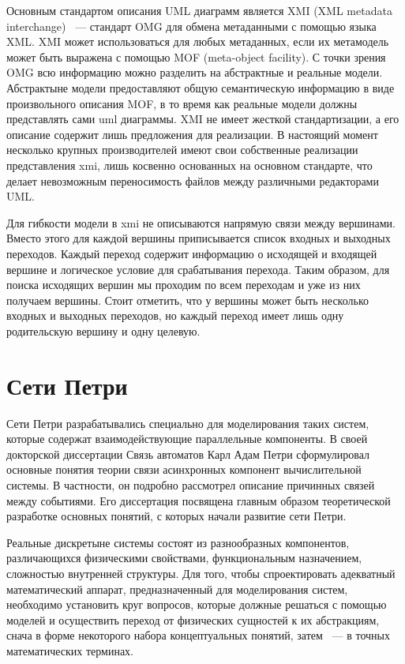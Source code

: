 Основным стандартом описания UML диаграмм является XMI (XML metadata interchange) ~--- стандарт OMG для обмена метаданными с помощью языка XML. XMI может использоваться для любых метаданных, если их метамодель может быть выражена с помощью MOF (meta-object facility). С точки зрения OMG всю информацию можно разделить на абстрактные и реальные модели. Абстрактыне модели предоставляют общую семантическую информацию в виде произвольного описания MOF, в то время как реальные модели должны представлять сами uml диаграммы. XMI не имеет жесткой стандартизации, а его описание содержит лишь предложения для реализации. В настоящий момент несколько крупных производителей имеют свои собственные реализации представления xmi, лишь косвенно основанных на основном стандарте, что делает невозможным переносимость файлов между различными редакторами UML.

Для гибкости модели в xmi не описываются напрямую связи между вершинами. Вместо этого для каждой вершины приписывается список входных и выходных переходов. Каждый переход содержит информацию о исходящей и входящей вершине и логическое условие для срабатывания перехода. Таким образом, для поиска исходящих вершин мы проходим по всем переходам и уже из них получаем вершины. Стоит отметить, что у вершины может быть несколько входных и выходных переходов, но каждый переход имеет лишь одну родительскую вершину и одну целевую.

\section{Сети Петри}

Сети Петри разрабатывались специально для моделирования таких систем, которые содержат взаимодействующие параллельные компоненты. В своей докторской диссертации Связь автоматов Карл Адам Петри сформулировал основные понятия теории связи асинхронных компонент вычислительной системы. В частности, он подробно рассмотрел описание причинных связей между событиями. Его диссертация посвящена главным образом теоретической разработке основных понятий, с которых начали развитие сети Петри. \cite{Kotov}

Реальные дискретыне системы состоят из разнообразных компонентов, различающихся физическими свойствами, функциональным назначением, сложностью внутренней структуры. Для того, чтобы спроектировать адекватный математический аппарат, предназначенный для моделирования систем, необходимо установить круг вопросов, которые должные решаться с помощью моделей и осуществить переход от физических сущностей к их абстракциям, снача в форме некоторого набора концептуальных понятий, затем ~--- в точных математических терминах.

